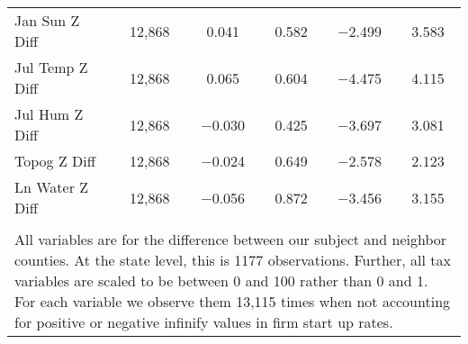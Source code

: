 \begin{table}[!htbp]
\begin{tabular}{@{\extracolsep{5pt}}lccccc}
Jan Sun Z Diff & 12,868 & 0.041 & 0.582 & $-$2.499 & 3.583 \\ 
Jul Temp Z Diff & 12,868 & 0.065 & 0.604 & $-$4.475 & 4.115 \\ 
Jul Hum Z Diff & 12,868 & $-$0.030 & 0.425 & $-$3.697 & 3.081 \\ 
Topog Z Diff & 12,868 & $-$0.024 & 0.649 & $-$2.578 & 2.123 \\ 
Ln Water Z Diff & 12,868 & $-$0.056 & 0.872 & $-$3.456 & 3.155 \\ 
\hline \\[-1.8ex] 
\multicolumn{6}{l}{All variables are for the difference between our subject and neighbor counties. At the state level, this is 1177 observations. Further, all tax variables are scaled to be between 0 and 100 rather than 0 and 1. For each variable we observe them 13,115 times when not accounting for positive or negative infinify values in firm start up rates.} \\ 
\end{tabular} 
\end{table} 
